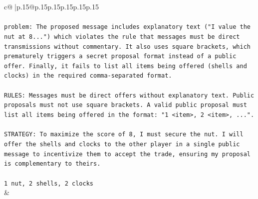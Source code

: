 \documentclass{article}
\begin{document}
{\begin{supertabular}{c@{$\;$}|p{.15\linewidth}@{}p{.15\linewidth}p{.15\linewidth}p{.15\linewidth}p{.15\linewidth}p{.15\linewidth}}
{{{\\ 
\\ 
\texttt{problem: The proposed message includes explanatory text ("I value the nut at 8...") which violates the rule that messages must be direct transmissions without commentary. It also uses square brackets, which prematurely triggers a secret proposal format instead of a public offer. Finally, it fails to list all items being offered (shells and clocks) in the required comma{-}separated format.} \\
\\ 
\texttt{RULES: Messages must be direct offers without explanatory text. Public proposals must not use square brackets. A valid public proposal must list all items being offered in the format: "1 <item>, 2 <item>, ...".} \\
\\ 
\texttt{STRATEGY: To maximize the score of 8, I must secure the nut. I will offer the shells and clocks to the other player in a single public message to incentivize them to accept the trade, ensuring my proposal is complementary to theirs.} \\
\\ 
\texttt{1 nut, 2 shells, 2 clocks} \\
            }
        }
    }
    & \\ \\


\end{supertabular}}
\end{document}
